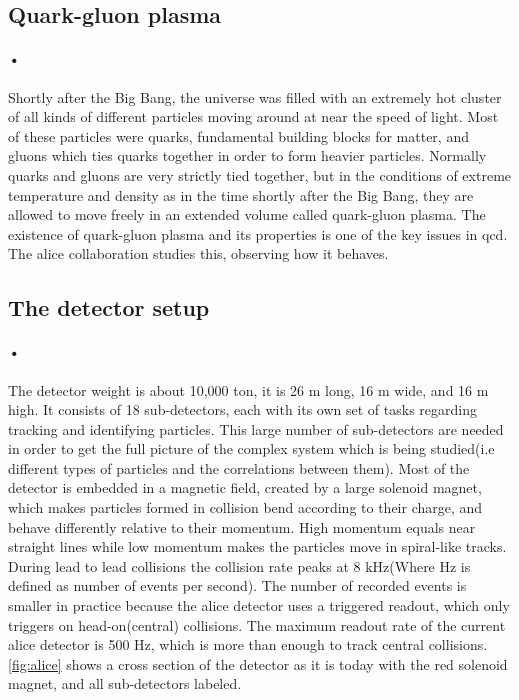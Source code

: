 \documentclass[a4paper, 12pt]{report}\dfrac{\right }{•}
\begin{document}
\subsection{Quark-gluon plasma}
\paragraph{•}
Shortly after the Big Bang, the universe was filled with an extremely hot cluster of all kinds of different particles moving around at near the speed of light\cite{alice-physics}.
Most of these particles were quarks, fundamental building blocks for matter, and gluons which ties quarks together in order to form heavier particles.
Normally quarks and gluons are very strictly tied together, but in the conditions of extreme temperature and density as in the time shortly after the Big Bang, they are allowed to move freely in an extended volume called quark-gluon plasma.
The existence of quark-gluon plasma and its properties is one of the key issues in \gls{qcd}.
The \gls{alice} collaboration studies this, observing how it behaves.

\subsection{The detector setup}
\paragraph{•}
The detector weight is about 10,000 ton, it is 26 m long, 16 m wide, and 16 m high\cite{alice-about}.
It consists of 18 sub-detectors, each with its own set of tasks regarding tracking and identifying particles.
This large number of sub-detectors are needed in order to get the full picture of the complex system which is being studied(i.e different types of particles and the correlations between them).
Most of the detector is embedded in a magnetic field, created by a large solenoid magnet, which makes particles formed in collision bend according to their charge, and behave differently relative to their momentum. High momentum equals near straight lines while low momentum makes the particles move in spiral-like tracks.
During lead to lead collisions the collision rate peaks at 8 kHz(Where Hz is defined as number of events per second).
The number of recorded events is smaller in practice because the \gls{alice} detector uses a triggered readout, which only triggers on head-on(central) collisions.
The maximum readout rate of the current \gls{alice} detector is 500 Hz, which is more than enough to track central collisions.
\ref{fig:alice} shows a cross section of the detector as it is today with the red solenoid magnet, and all sub-detectors labeled.
\end{document}
